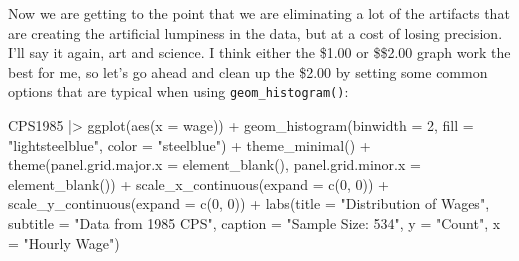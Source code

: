 \documentclass[
  letterpaper,
]{book}
\newenvironment{Shaded}{\begin{snugshade}}{\end{snugshade}}
\newcommand{\AttributeTok}[1]{\textcolor[rgb]{0.40,0.45,0.13}{#1}}
\newcommand{\DecValTok}[1]{\textcolor[rgb]{0.68,0.00,0.00}{#1}}
\newcommand{\FunctionTok}[1]{\textcolor[rgb]{0.28,0.35,0.67}{#1}}
\newcommand{\NormalTok}[1]{\textcolor[rgb]{0.00,0.23,0.31}{#1}}
\newcommand{\SpecialCharTok}[1]{\textcolor[rgb]{0.37,0.37,0.37}{#1}}
\newcommand{\StringTok}[1]{\textcolor[rgb]{0.13,0.47,0.30}{#1}}
\begin{document}
Now we are getting to the point that we are eliminating a lot of the
artifacts that are creating the artificial lumpiness in the data, but at
a cost of losing precision. I'll say it again, art and science. I think
either the \$1.00 or \$\$2.00 graph work the best for me, so let's go
ahead and clean up the \$2.00 by setting some common options that are
typical when using \texttt{geom\_histogram()}:

\begin{Shaded}
\begin{Highlighting}[]
\NormalTok{CPS1985 }\SpecialCharTok{|\textgreater{}} \FunctionTok{ggplot}\NormalTok{(}\FunctionTok{aes}\NormalTok{(}\AttributeTok{x =}\NormalTok{ wage)) }\SpecialCharTok{+}
  \FunctionTok{geom\_histogram}\NormalTok{(}\AttributeTok{binwidth =} \DecValTok{2}\NormalTok{,}
                 \AttributeTok{fill =} \StringTok{"lightsteelblue"}\NormalTok{,}
                 \AttributeTok{color =} \StringTok{"steelblue"}\NormalTok{) }\SpecialCharTok{+}
  \FunctionTok{theme\_minimal}\NormalTok{() }\SpecialCharTok{+}  
  \FunctionTok{theme}\NormalTok{(}\AttributeTok{panel.grid.major.x =} \FunctionTok{element\_blank}\NormalTok{(),}
        \AttributeTok{panel.grid.minor.x =} \FunctionTok{element\_blank}\NormalTok{()) }\SpecialCharTok{+}
  \FunctionTok{scale\_x\_continuous}\NormalTok{(}\AttributeTok{expand =} \FunctionTok{c}\NormalTok{(}\DecValTok{0}\NormalTok{, }\DecValTok{0}\NormalTok{)) }\SpecialCharTok{+}
  \FunctionTok{scale\_y\_continuous}\NormalTok{(}\AttributeTok{expand =} \FunctionTok{c}\NormalTok{(}\DecValTok{0}\NormalTok{, }\DecValTok{0}\NormalTok{)) }\SpecialCharTok{+}
  \FunctionTok{labs}\NormalTok{(}\AttributeTok{title =} \StringTok{"Distribution of Wages"}\NormalTok{,}
       \AttributeTok{subtitle =} \StringTok{"Data from 1985 CPS"}\NormalTok{,}
       \AttributeTok{caption =} \StringTok{"Sample Size: 534"}\NormalTok{,}
       \AttributeTok{y =} \StringTok{"Count"}\NormalTok{,}
       \AttributeTok{x =} \StringTok{"Hourly Wage"}\NormalTok{)}
\end{Highlighting}
\end{Shaded}
\end{document}
